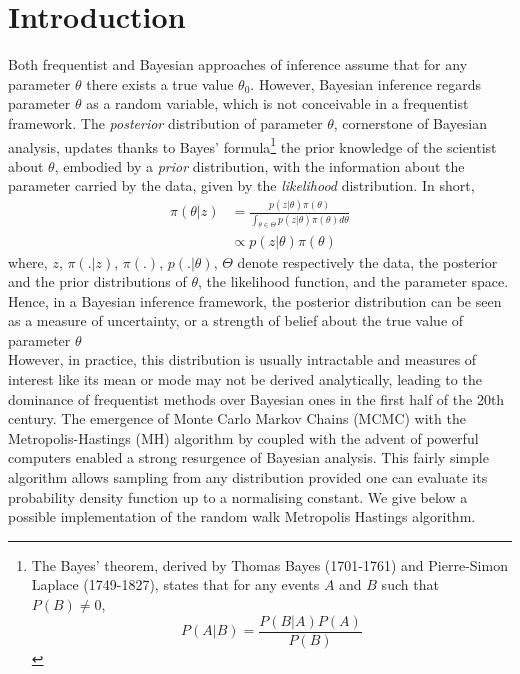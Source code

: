 \documentclass[11pt,a4paper]{report}\usepackage[]{graphicx}\usepackage[]{color}
\begin{document}
\clearpage



\tableofcontents
{}

\chapter*{Introduction}
\label{sec:intro}

Both frequentist and Bayesian approaches of inference assume that for any parameter $\theta$ there exists a true value $\theta_0$. However, Bayesian inference regards parameter $\theta$ as a random variable, which is not conceivable in a frequentist framework. The \textit{posterior} distribution of parameter $\theta$, cornerstone of Bayesian analysis, updates thanks to Bayes' formula\footnote{The Bayes' theorem, derived by Thomas Bayes (1701-1761) and Pierre-Simon Laplace (1749-1827), states that for any events $A$ and $B$ such that $P(B)\neq 0$, $$P(A|B)=\frac{P(B|A)P(A)}{P(B)}$$} the prior knowledge of the scientist about $\theta$, embodied by a \textit{prior} distribution, with the information about the parameter carried by the data, given by the \textit{likelihood} distribution. In short, 
\begin{align}
\label{eq:bayes}
    \pi(\theta|z)&=\frac{p(z|\theta)\pi(\theta)}{\int_{\theta\in\Theta} p(z|\theta)\pi(\theta)d\theta}\\
    &\propto p(z|\theta)\pi(\theta)\nonumber
\end{align}
where, $z$, $\pi(.|z)$, $\pi(.)$, $p(.|\theta)$, $\Theta$ denote respectively the data, the posterior and the prior distributions of $\theta$, the likelihood function, and the parameter space.\\
Hence, in a Bayesian inference framework, the posterior distribution can be seen as a measure of uncertainty, or a strength of belief about the true value of parameter $\theta$\\
However, in practice, this distribution is usually intractable and measures of interest like its mean or mode may not be derived analytically, leading to the dominance of frequentist methods over Bayesian ones in the first half of the 20th century. The emergence of Monte Carlo Markov Chains (MCMC) with the Metropolis-Hastings (MH) algorithm by \cite{metropolis1953equation} coupled with the advent of powerful computers enabled a strong resurgence of Bayesian analysis. This fairly simple algorithm allows sampling from any distribution provided one can evaluate its probability density function up to a normalising constant. We give below a possible implementation of the random walk Metropolis Hastings algorithm.
\end{document}
